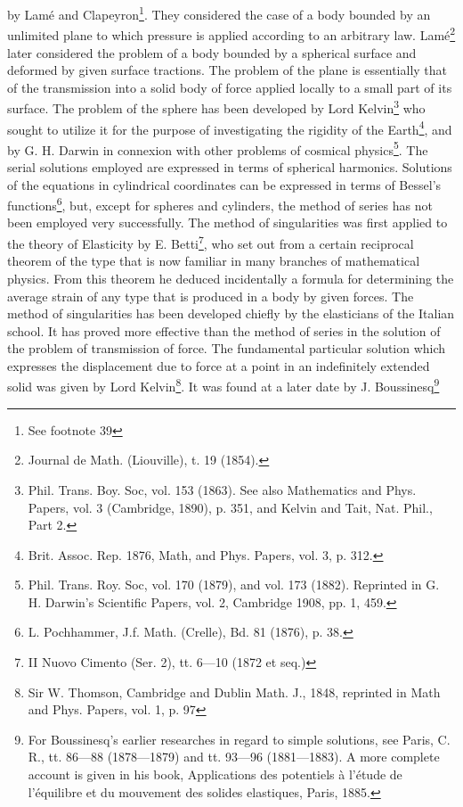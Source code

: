 by Lamé and Clapeyron\footnote{See footnote 39}. They considered the case of a
body bounded by an unlimited plane to which pressure is applied according to an
arbitrary law.
\setcounter{footnote}{59}
Lamé\footnote{Journal de Math. (Liouville), t. 19 (1854).}
later considered the problem of a body bounded by a spherical surface
and deformed by given surface tractions. The problem of the plane is
essentially that of the transmission into a solid body of force applied locally
to a small part of its surface. The problem of the sphere has been developed
by Lord
Kelvin\footnote{Phil. Trans. Boy. Soc, vol. 153 (1863). See also Mathematics
and Phys. Papers, vol. 3 (Cambridge, 1890), p. 351, and Kelvin and Tait, Nat.
Phil., Part 2.} who sought to utilize it for the purpose of investigating the
rigidity of the Earth\footnote{Brit. Assoc. Rep. 1876, Math, and Phys. Papers,
vol. 3, p. 312.}, and by G. H. Darwin in connexion with other problems of
cosmical
physics\footnote{Phil. Trans. Roy. Soc, vol. 170 (1879), and vol. 173 (1882).
Reprinted in G. H. Darwin's Scientific Papers, vol. 2, Cambridge 1908, pp. 1, 459.}.
The serial solutions employed are expressed
in terms of spherical harmonics. Solutions of the equations in cylindrical
coordinates can be expressed in terms of Bessel's
functions\footnote{L. Pochhammer, J.f. Math. (Crelle), Bd. 81 (1876), p. 38.},
but, except for spheres and cylinders, the method of series has not been employed very
successfully. The method of singularities was first applied to the theory of
Elasticity by E. Betti\footnote{II Nuovo Cimento (Ser. 2), tt. 6—10 (1872 et seq.)},
who set out from a certain reciprocal theorem of the
type that is now familiar in many branches of mathematical physics. From
this theorem he deduced incidentally a formula for determining the average
strain of any type that is produced in a body by given forces. The method
of singularities has been developed chiefly by the elasticians of the Italian
school. It has proved more effective than the method of series in the solution
of the problem of transmission of force. The fundamental particular solution
which expresses the displacement due to force at a point in an indefinitely
extended solid was given by Lord
Kelvin\footnote{Sir W. Thomson, Cambridge and Dublin Math. J., 1848, reprinted in Math
and Phys. Papers, vol. 1, p. 97}.  It was found at a later date by J.
Boussinesq\footnote{For Boussinesq's earlier researches in
regard to simple solutions, see Paris, C. R., tt. 86—88 (1878—1879)
and tt. 93—96 (1881—1883). A more complete account is given in his book,
Applications des potentiels à l'étude de l'équilibre et du mouvement
des solides elastiques, Paris, 1885.}
